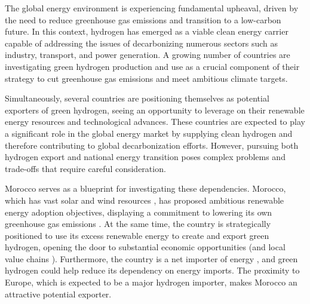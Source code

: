 The global energy environment is experiencing fundamental upheaval, driven by the need to reduce greenhouse gas emissions and transition to a low-carbon future. In this context, hydrogen has emerged as a viable clean energy carrier capable of addressing the issues of decarbonizing numerous sectors such as industry, transport, and power generation. A growing number of countries are investigating green hydrogen production and use as a crucial component of their strategy to cut greenhouse gas emissions and meet ambitious climate targets.


Simultaneously, several countries are positioning themselves as potential exporters of green hydrogen, seeing an opportunity to leverage on their renewable energy resources and technological advances. %
These countries are expected to play a significant role in the global energy market by supplying clean hydrogen and therefore contributing to global decarbonization efforts. However, pursuing both hydrogen export and national energy transition poses complex problems and trade-offs that require careful consideration.

Morocco serves as a blueprint for investigating these dependencies. Morocco, which has vast solar and wind resources \cite{Peters2023, Touili2018, Sterl2022}, has proposed ambitious renewable energy adoption objectives, displaying a commitment to lowering its own greenhouse gas emissions \cite{MarHyStrat2021}. At the same time, the country is strategically positioned to use its excess renewable energy to create and export green hydrogen, opening the door to substantial economic opportunities (and local value chains \cite{Ersoy2022}). Furthermore, the country is a net importer of energy \cite{IEA2022}, and green hydrogen could help reduce its dependency on energy imports. The proximity to Europe, which is expected to be a major hydrogen importer, makes Morocco an attractive potential exporter. %

